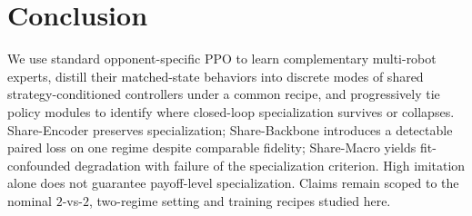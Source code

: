 \section{Conclusion}
\label{sec:conclusion}

We use standard opponent-specific PPO to learn complementary multi-robot
experts, distill their matched-state behaviors into discrete modes of shared
strategy-conditioned controllers under a common recipe, and progressively tie
policy modules to identify where closed-loop specialization survives or
collapses. Share-Encoder preserves specialization; Share-Backbone introduces a
detectable paired loss on one regime despite comparable fidelity; Share-Macro
yields fit-confounded degradation with failure of the specialization criterion.
High imitation alone does not guarantee payoff-level specialization. Claims
remain scoped to the nominal $2$-vs-$2$, two-regime setting and training recipes
studied here.
